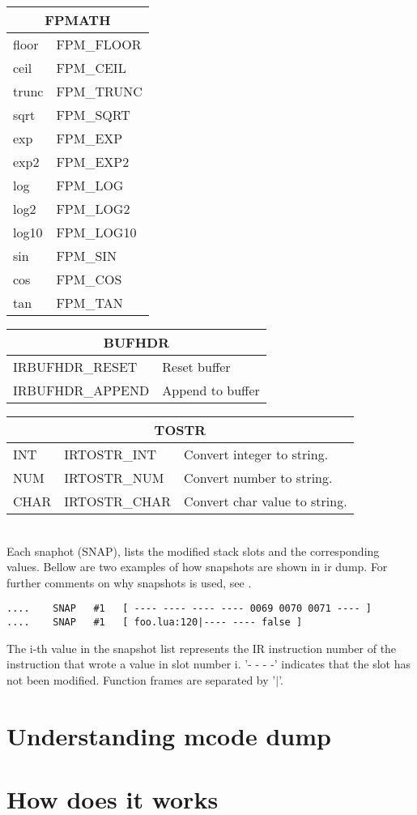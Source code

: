 \begin{table}
\centering
\begin{tabular}{|l|l|}
\hline
\multicolumn{2}{|c|}{FPMATH}\\\hline
floor & FPM\_FLOOR \\
ceil  & FPM\_CEIL  \\
trunc & FPM\_TRUNC \\
sqrt  & FPM\_SQRT  \\
exp   & FPM\_EXP   \\
exp2  & FPM\_EXP2  \\
log   & FPM\_LOG   \\
log2  & FPM\_LOG2  \\
log10 & FPM\_LOG10 \\
sin   & FPM\_SIN   \\
cos   & FPM\_COS   \\
tan   & FPM\_TAN   \\
\hline
\end{tabular}
\end{table}
\begin{table}
\centering
\begin{tabular}{|l|l|}
\hline
\multicolumn{2}{|c|}{BUFHDR}\\\hline
IRBUFHDR\_RESET  & Reset buffer \\
IRBUFHDR\_APPEND & Append to buffer \\
\hline
\end{tabular}
\end{table}
\begin{table}
\centering
\begin{tabular}{|l|l|l|}
\hline
\multicolumn{3}{|c|}{TOSTR}\\\hline
INT  & IRTOSTR\_INT  & Convert integer to string.  \\
NUM  & IRTOSTR\_NUM  & Convert number to string.  \\
CHAR & IRTOSTR\_CHAR & Convert char value to string.  \\\hline
\end{tabular}
\end{table}

\\
Each snaphot (SNAP), lists the modified stack slots and the corresponding values.
Bellow are two examples of how snapshots are shown in ir dump. For further
comments on why snapshots is used, see .
\begin{verbatim}
....    SNAP   #1   [ ---- ---- ---- ---- 0069 0070 0071 ---- ]
....    SNAP   #1   [ foo.lua:120|---- ---- false ]
\end{verbatim}
The i-th value in the snapshot list represents the IR instruction number of the
instruction that wrote a value in slot number i. '- - - -' indicates that the slot
has not been modified. Function frames are separated by '$\vert$'.


\section{Understanding mcode dump}
\label{Sec:dump-mcode}

\section{How does it works}
\label{Sec:dump-internals}

